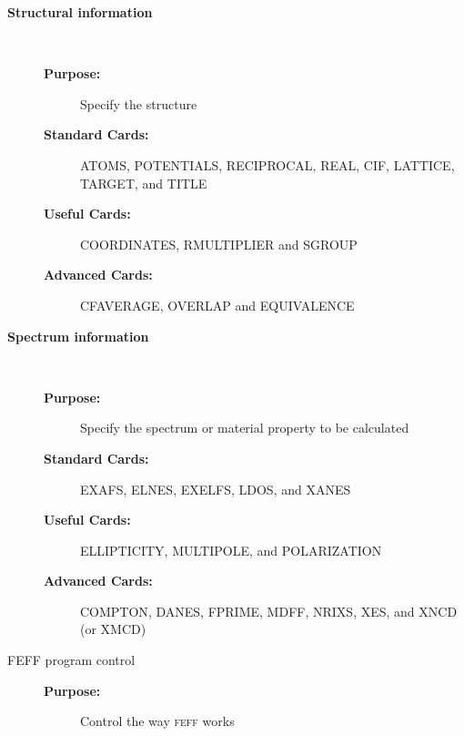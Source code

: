 \documentclass[11pt,oneside]{report} %
\renewcommand{\htmlref}[2]{\hyperlink{#2}{#1}}
\newcommand{\program}[1]{\textsc{#1}}
\newcommand{\feff}{\program{feff}}
\renewcommand{\htmlref}[2]{{#1}} %
\begin{document}
\begin{description}

\item[\large\textbf{Structural information}]\dotfill\
  \begin{description}
  \item[\textbf{Purpose:}] Specify the structure
  \item[\textbf{Standard Cards:}] 
    \htmlref{ATOMS}{card:ato}, 
    \htmlref{POTENTIALS}{card:pot}, 
    \htmlref{RECIPROCAL}{card:rec},
    \htmlref{REAL}{card:rea},
    \htmlref{CIF}{card:cif},
    \htmlref{LATTICE}{card:lat},
    \htmlref{TARGET}{card:tar}, 
    and \htmlref{TITLE}{card:tit}
  \item[\textbf{Useful Cards:}] 
    \htmlref{COORDINATES}{card:coo},
    \htmlref{RMULTIPLIER}{card:rmu} and
    \htmlref{SGROUP}{card:sgr}
  \item[\textbf{Advanced Cards:}] 
    \htmlref{CFAVERAGE}{card:cfa},
    \htmlref{OVERLAP}{card:ove} and
    \htmlref{EQUIVALENCE}{card:equ}
  \end{description}

\item[\large\textbf{Spectrum information}]\dotfill\
  \begin{description}
  \item[\textbf{Purpose:}] Specify the spectrum or material property to be calculated
  \item[\textbf{Standard Cards:}] 
    \htmlref{EXAFS}{card:exa},
    \htmlref{ELNES}{card:eln},
    \htmlref{EXELFS}{card:exe},
    \htmlref{LDOS}{card:ldo},
    and \htmlref{XANES}{card:xan}
  \item[\textbf{Useful Cards:}] 
    \htmlref{ELLIPTICITY}{card:ell},
    \htmlref{MULTIPOLE}{card:mul},
    and \htmlref{POLARIZATION}{card:pol} 
  \item[\textbf{Advanced Cards:}] 
    \htmlref{COMPTON}{card:com},
    \htmlref{DANES}{card:dan}, 
    \htmlref{FPRIME}{card:fpr},
    \htmlref{MDFF}{card:mdf}, 
    \htmlref{NRIXS}{card:nri},
    \htmlref{XES}{card:xes},
    and \htmlref{XNCD (or XMCD)}{card:xnc}
  \end{description}

  \item[{\large FEFF program control}]  \hfill
  \begin{description}
  \item[\textbf{Purpose:}] Control the way {\feff} works


\end{description}
\end{description}
\end{document}
